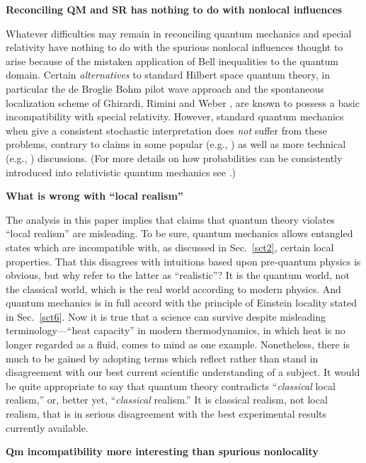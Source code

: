 \documentclass[10pt]{article} %
\def\outl#1{\par{\medskip\noindent\hspace*{.5cm}\bf
      \mathversion{bold}#1\mathversion{normal}\smallskip} }
\def\np{} \def\xa{} \def\xb{} \def\xn{} \def\xp{}
\def\outl#1{} \def\np{} \def\xa{} \def\xb{} \def\xn{} \def\xp{}
\def\outl#1{\par{\medskip\noindent\hspace*{.5cm}\bf
      \mathversion{bold}#1\mathversion{normal}\smallskip} }
\def\np{\newpage }\def\xn{\nopagebreak }\def\xp{\pagebreak }
\begin{document}
\xb
\outl{Reconciling QM and SR has nothing to do with nonlocal influences}
\xa


Whatever difficulties may remain in reconciling quantum mechanics and special
relativity have nothing to do with the spurious nonlocal influences thought to
arise because of the mistaken application of Bell inequalities to the quantum
domain. Certain \emph{alternatives} to standard Hilbert space quantum theory,
in particular the de Broglie Bohm pilot wave approach \cite{Glds06} and the
spontaneous localization scheme of Ghirardi, Rimini and Weber \cite{BsGh03},
are known to possess a basic incompatibility with special relativity.
However, standard quantum mechanics when give a consistent stochastic
interpretation does \emph{not} suffer from these problems, contrary to claims
in some popular (e.g., \cite{AlGl09}) as well as more technical (e.g.,
\cite{Mdln02}) discussions. (For more details on how probabilities can be
consistently introduced into relativistic quantum mechanics see
\cite{Grff02b}.)

\xb
\outl{What is wrong with ``local realism''}
\xa



The analysis in this paper implies that claims that quantum theory violates
``local realism'' are misleading. To be sure, quantum mechanics allows
entangled states which are incompatible with, as discussed in Sec.~\ref{sct2},
certain local properties.  That this disagrees with intuitions based upon
pre-quantum physics is obvious, but why refer to the latter as ``realistic''?
It is the quantum world, not the classical world, which is the real world
according to modern physics. And quantum mechanics is in full accord with the
principle of Einstein locality stated in Sec.~\ref{sct6}.  Now it is true that
a science can survive despite misleading terminology---``heat capacity'' in
modern thermodynamics, in which heat is no longer regarded as a fluid, comes
to mind as one example.  Nonetheless, there is much to be gained by adopting
terms which reflect rather than stand in disagreement with our best current
scientific understanding of a subject.  It would be quite appropriate to say
that quantum theory contradicts ``\emph{classical} local realism,'' or, better
yet, ``\emph{classical} realism.''  It is classical realism, not local
realism, that is in serious disagreement with the best experimental results
currently available.

\xb
\outl{Qm incompatibility more interesting than spurious nonlocality}
\xa
\end{document}

